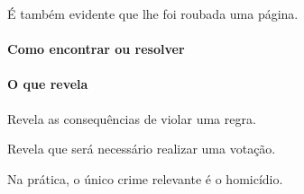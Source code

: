 {É também evidente que lhe foi roubada uma página.

\paragraph{Como encontrar ou resolver}


\paragraph{O que revela}

Revela as consequências de violar uma regra.

Revela que será necessário realizar uma votação.

Na prática, o único crime relevante é o homicídio.


}
